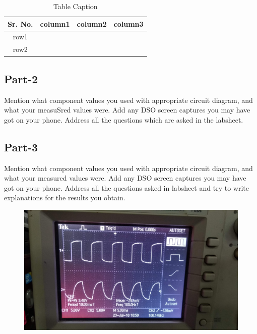 \documentclass[12pt]{article}
\begin{document}
\begin{table}[!hbt]
		\begin{center}
		\caption{Table Caption}
		\begin{tabular}{|c|c|c|c|}
			\hline
			Sr. No. & column1 & column2 & column3\\
			\hline
			row1 &  &  & \\
			\hline
			row2 &  &  & \\
			\hline
            
		\end{tabular}
		\end{center}
\end{table}

\subsection{Part-2}

Mention what component values you used with appropriate circuit diagram, and what your measuSred values were. Add any DSO screen captures you may have got on your phone. Address all the questions which are asked in the labsheet.\

\subsection{Part-3}

Mention what component values you used with appropriate circuit diagram, and what your measured values were. Add any DSO screen captures you may have got on your phone. Address all the questions asked in labsheet and try to write explanations for the results you obtain.

\begin{figure}
\centering
\includegraphics[scale = 0.08]{100hz.jpg}
\end{figure}
\end{document}
